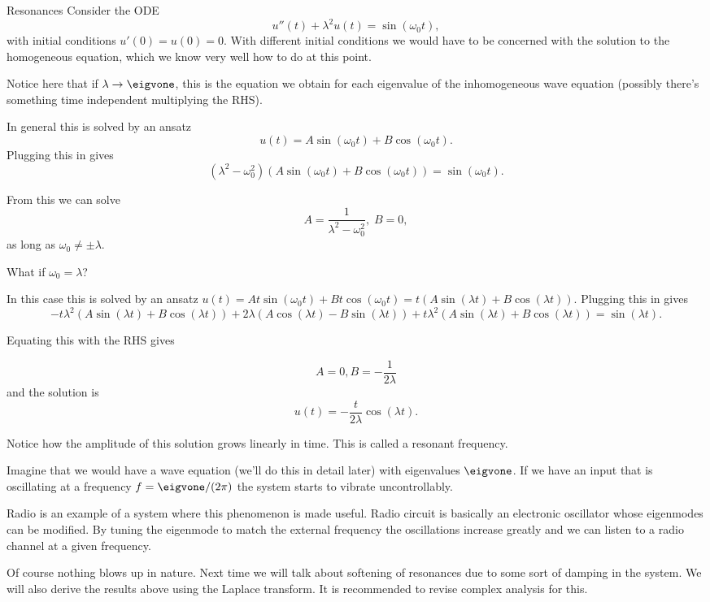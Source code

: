 \begin{frame}{Resonances}
	Consider the ODE 
	\[ u''(t) + \lambda^2 u(t) = \sin(\omega_0 t), \]
	with initial conditions $ u'(0)=u(0) = 0 $. With different initial conditions we would have to be concerned with the solution to the homogeneous equation, which we know very well how to do at this point.
	
	\pause
	Notice here that if $ \lambda \to \eigvone $, this is the equation we obtain for each eigenvalue of the inhomogeneous wave equation (possibly there's something time independent multiplying the RHS). 
	
	\pause
	In general this is solved by an ansatz \[ u(t) = A \sin(\omega_0 t) + B \cos(\omega_0 t). \]
	Plugging this in gives 
	\[  (\lambda^2 -\omega_0^2) (A \sin(\omega_0 t) + B \cos(\omega_0 t)) = \sin(\omega_0 t). \]
\end{frame}

\begin{frame}
	From this we can solve 
	\[ A = \frac{1}{\lambda^2-\omega_0^2}, \; B=0, \]
	as long as $ \omega_0 \neq \pm \lambda $.
	
	\pause
	What if $ \omega_0 = \lambda $?
	
	\pause
	In this case this is solved by an ansatz $ u(t) = A t \sin(\omega_0 t) + B t \cos(\omega_0 t)  = t(A  \sin(\lambda t) + B  \cos(\lambda t)) $. Plugging this in gives
	\[ -t \lambda^2 (A  \sin(\lambda t) + B  \cos(\lambda t) ) 
	+ 2 \lambda (A \cos(\lambda t) - B \sin(\lambda t)  ) + t\lambda^2 (A  \sin(\lambda t) + B  \cos(\lambda t)) = \sin(\lambda t). \]
	
	\pause
	Equating this with the RHS gives 
	
	\pause
	\[ A= 0, B = -\frac{1}{2 \lambda} \]
	and the solution is 
	\[ u(t) = -\frac{t}{2 \lambda} \cos(\lambda t). \]
\end{frame}

\begin{frame}
	Notice how the amplitude of this solution grows linearly in time. This is called a resonant frequency. 
	
	\pause
	Imagine that we would have a wave equation (we'll do this in detail later) with eigenvalues 
	$ \eigvone $. If we have an input that is oscillating at a frequency $ f = \eigvone/(2\pi) $ the system starts to vibrate uncontrollably. 
	
	\pause
	Radio is an example of a system where this phenomenon is made useful. Radio circuit is basically an electronic oscillator whose eigenmodes can be modified. By tuning the eigenmode to match the external frequency the oscillations increase greatly and we can listen to a radio channel at a given frequency. 
	
	\pause
	Of course nothing blows up in nature. Next time we will talk about softening of resonances due to some sort of damping in the system. We will also derive the results above using the Laplace transform. It is recommended to revise complex analysis for this. 
\end{frame}


